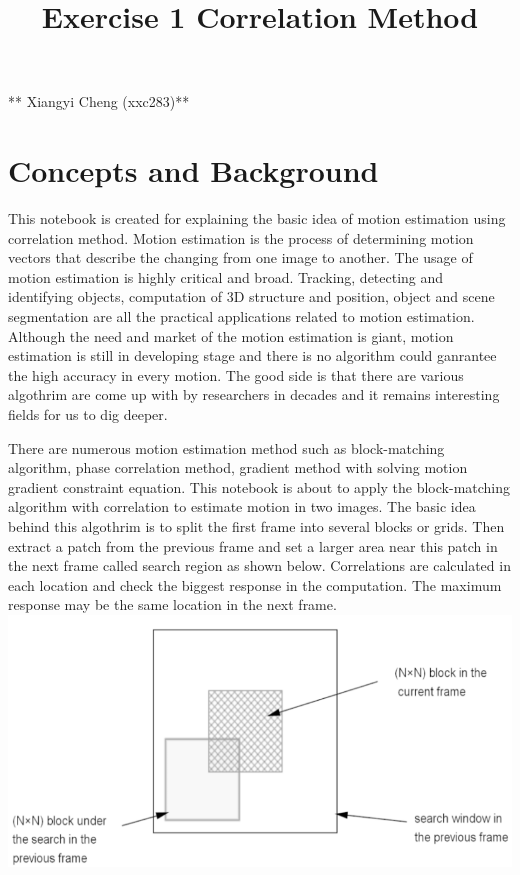 \documentclass[11pt]{article}
\title{Exercise 1  Correlation Method}
\makeatletter
\def\maxwidth{\ifdim\Gin@nat@width>\linewidth\linewidth
    \else\Gin@nat@width\fi}
\let\Oldincludegraphics\includegraphics
\renewcommand{\includegraphics}[1]{\Oldincludegraphics[width=.8\maxwidth]{#1}}
\makeatother
\begin{document}
    
    
    \maketitle
    
    

    
    ** Xiangyi Cheng (xxc283)**

    \hypertarget{concepts-and-background}{%
\section{Concepts and Background}\label{concepts-and-background}}

    This notebook is created for explaining the basic idea of motion
estimation using correlation method. Motion estimation is the process of
determining motion vectors that describe the changing from one image to
another. The usage of motion estimation is highly critical and broad.
Tracking, detecting and identifying objects, computation of 3D structure
and position, object and scene segmentation are all the practical
applications related to motion estimation. Although the need and market
of the motion estimation is giant, motion estimation is still in
developing stage and there is no algorithm could ganrantee the high
accuracy in every motion. The good side is that there are various
algothrim are come up with by researchers in decades and it remains
interesting fields for us to dig deeper.

There are numerous motion estimation method such as block-matching
algorithm, phase correlation method, gradient method with solving motion
gradient constraint equation. This notebook is about to apply the
block-matching algorithm with correlation to estimate motion in two
images. The basic idea behind this algothrim is to split the first frame
into several blocks or grids. Then extract a patch from the previous
frame and set a larger area near this patch in the next frame called
search region as shown below. Correlations are calculated in each
location and check the biggest response in the computation. The maximum
response may be the same location in the next frame.
\includegraphics{block_r.png}
\end{document}
